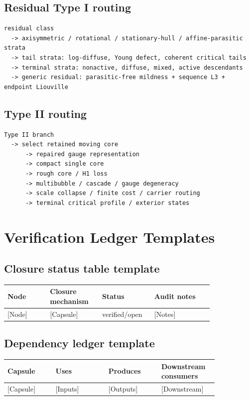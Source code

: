 \documentclass[11pt]{article}
\theoremstyle{plain}
\theoremstyle{definition}
\theoremstyle{remark}
\begin{document}
\subsection{Residual Type I routing}
\begin{lstlisting}
residual class
  -> axisymmetric / rotational / stationary-hull / affine-parasitic strata
  -> tail strata: log-diffuse, Young defect, coherent critical tails
  -> terminal strata: nonactive, diffuse, mixed, active descendants
  -> generic residual: parasitic-free mildness + sequence L3 + endpoint Liouville
\end{lstlisting}

\subsection{Type II routing}
\begin{lstlisting}
Type II branch
  -> select retained moving core
      -> repaired gauge representation
      -> compact single core
      -> rough core / H1 loss
      -> multibubble / cascade / gauge degeneracy
      -> scale collapse / finite cost / carrier routing
      -> terminal critical profile / exterior states
\end{lstlisting}

\section{Verification Ledger Templates}
\label{app:ledger-templates}

\subsection{Closure status table template}
\begin{center}
\begin{longtable}{p{0.18\linewidth}p{0.22\linewidth}p{0.17\linewidth}p{0.25\linewidth}}
\toprule
Node & Closure mechanism & Status & Audit notes \\
\midrule
{[Node]} & {[Capsule]} & verified/open & {[Notes]} \\
\bottomrule
\end{longtable}
\end{center}

\subsection{Dependency ledger template}
\begin{center}
\begin{longtable}{p{0.20\linewidth}p{0.22\linewidth}p{0.22\linewidth}p{0.20\linewidth}}
\toprule
Capsule & Uses & Produces & Downstream consumers \\
\midrule
{[Capsule]} & {[Inputs]} & {[Outputs]} & {[Downstream]} \\
\bottomrule
\end{longtable}
\end{center}
\end{document}

